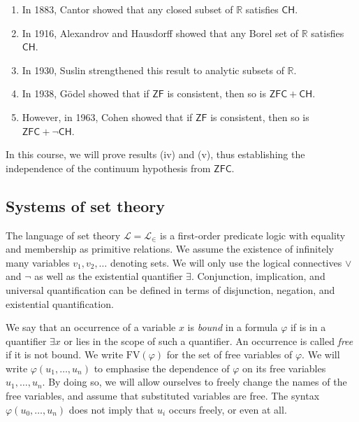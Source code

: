 \begin{enumerate}
    \item In 1883, Cantor showed that any closed subset of \( \mathbb R \) satisfies \( \mathsf{CH} \).
    \item In 1916, Alexandrov and Hausdorff showed that any Borel set of \( \mathbb R \) satisfies \( \mathsf{CH} \).
    \item In 1930, Suslin strengthened this result to analytic subsets of \( \mathbb R \).
    \item In 1938, G\"odel showed that if \( \mathsf{ZF} \) is consistent, then so is \( \mathsf{ZFC} + \mathsf{CH} \).
    \item However, in 1963, Cohen showed that if \( \mathsf{ZF} \) is consistent, then so is \( \mathsf{ZFC} + \neg\mathsf{CH} \).
\end{enumerate}
In this course, we will prove results (iv) and (v), thus establishing the independence of the continuum hypothesis from \( \mathsf{ZFC} \).

\subsection{Systems of set theory}
The language of set theory \( \mathcal L = \mathcal L_\in \) is a first-order predicate logic with equality and membership as primitive relations.
We assume the existence of infinitely many variables \( v_1, v_2, \dots \) denoting sets.
We will only use the logical connectives \( \vee \) and \( \neg \) as well as the existential quantifier \( \exists \).
Conjunction, implication, and universal quantification can be defined in terms of disjunction, negation, and existential quantification.

We say that an occurrence of a variable \( x \) is \emph{bound} in a formula \( \varphi \) if is in a quantifier \( \exists x \) or lies in the scope of such a quantifier.
An occurrence is called \emph{free} if it is not bound.
We write \( \mathrm{FV}(\varphi) \) for the set of free variables of \( \varphi \).
We will write \( \varphi(u_1, \dots, u_n) \) to emphasise the dependence of \( \varphi \) on its free variables \( u_1, \dots, u_n \).
By doing so, we will allow ourselves to freely change the names of the free variables, and assume that substituted variables are free.
The syntax \( \varphi(u_0, \dots, u_n) \) does not imply that \( u_i \) occurs freely, or even at all.

